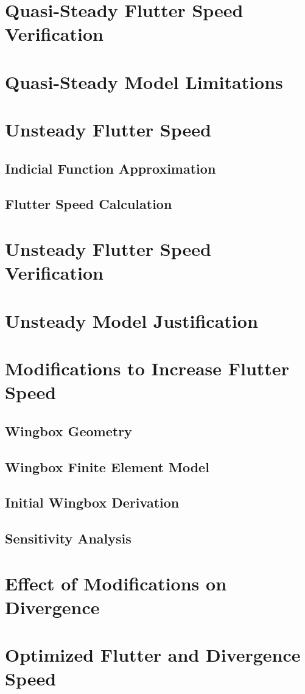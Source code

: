 \section{Quasi-Steady Flutter Speed Verification}

\section{Quasi-Steady Model Limitations}

\section{Unsteady Flutter Speed}

\subsection{Indicial Function Approximation}

\subsection{Flutter Speed Calculation}

\section{Unsteady Flutter Speed Verification}

\section{Unsteady Model Justification}

\section{Modifications to Increase Flutter Speed}

\subsection{Wingbox Geometry}

\subsection{Wingbox Finite Element Model}

\subsection{Initial Wingbox Derivation}

\subsection{Sensitivity Analysis}

\section{Effect of Modifications on Divergence}

\section{Optimized Flutter and Divergence Speed}

